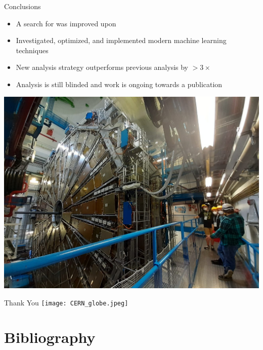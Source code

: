 \documentclass[aspectratio=169,xcolor=table]{beamer}
\begin{document}
  \begin{frame}[t]{Conclusions}
    \begin{itemize}
      \item A search for \HpmLong was improved upon
      \item Investigated, optimized, and implemented modern machine learning techniques 
      \item New analysis strategy outperforms previous analysis by $>3\times$
      \item Analysis is still blinded and work is ongoing towards a publication
    \end{itemize}
    \centering
    \includegraphics[height=.5\textheight,keepaspectratio=true]{ATLAS_Tour.jpg}
  \end{frame}

  \begin{frame}{Thank You}
    \centering
    \texttt{[image: CERN\_globe.jpeg]}
  \end{frame}

  \subsection { }

\appendix
\section{Bibliography }
\end{document}
